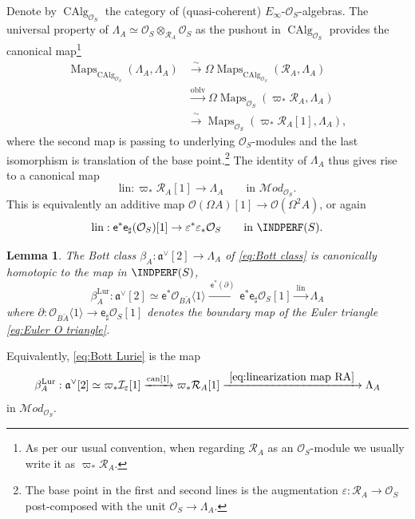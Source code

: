 \documentclass[12pt, oneside]{amsart}
\numberwithin{equation}{section}
\newtheorem{lemma}[subsubsection]{Lemma}
\theoremstyle{remark}
\theoremstyle{plain}
\newcommand{\MOD}{\mathcal{M}\textit{od}}
\DeclareMathOperator{\Map}{Maps}
\newcommand{\R}{\mathcal{R}}
\newcommand{\RA}{\R_A}
\newcommand{\frav}{\mathfrak{a}^\vee}
\newcommand{\lam}{\Lambda}
\newcommand{\OO}{\mathcal{O}}
\newcommand{\CAlg}{\operatorname{CAlg}}
\newcommand{\Thom}[1]{\langle #1 \rangle}
\newcommand{\eps}{\varepsilon}
\newcommand{\sfe}{\mathsf{e}}
\begin{document}
Denote by $\CAlg_{\OO_S}$ the category of (quasi-coherent) $E_\infty$-$\OO_S$-algebras.
The universal property of $\lam_A \simeq \OO_S \otimes_{\RA} \OO_S$ as the pushout in $\CAlg_{\OO_S}$ provides the canonical map\footnote{%
  As per our usual convention, when regarding $\RA$ as an $\OO_S$-module we usually write it as $\varpi_* \RA$.
}
\[\begin{aligned}
  \Map_{\CAlg_{\OO_S}}(\lam_A, \lam_A)
  &\xrightarrow{~\sim~} \Omega \Map_{\CAlg_{\OO_S}}(\RA, \lam_A)\\
  &\xrightarrow{\mathrm{oblv}} \Omega \Map_{\OO_S}(\varpi_* \RA, \lam_A)\\
  &\xrightarrow{~\sim~} \Map_{\OO_S}(\varpi_* \RA[1], \lam_A),
\end{aligned}\]
where the second map is passing to underlying $\OO_S$-modules and the last isomorphism is translation of the base point.\footnote{%
  The base point in the first and second lines is the augmentation $\eps : \RA \to \OO_S$ post-composed with the unit $\OO_S \to \lam_A$.
}
The identity of $\lam_A$ thus gives rise to a canonical map
\begin{equation}\label{eq:linearization map RA}
  \mathrm{lin} : \varpi_* \RA[1] \to \lam_A
  \qquad \text{in } \MOD_{\OO_S}.
\end{equation}
This is equivalently an additive map $\OO(\Omega A)[1] \to \OO(\Omega^2 A)$, or again
\begin{equation}\label{eq:linearization map}
  \mathrm{lin} : \sfe^* \sfe_\sharp (\OO_S)[1] \to \eps^*\eps_*\OO_S
  \qquad \text{in } \INDPERF(S).
\end{equation}

\begin{lemma}\label{lem:Bott vs Lurie}
  The Bott class $\beta_A : \frav[2] \to \lam_A$ of \eqref{eq:Bott class} is canonically homotopic to the map in $\INDPERF(S)$,
  \begin{equation}\label{eq:Bott Lurie}
    \beta_A^{\mathrm{Lur}} : \frav[2]
    \simeq \sfe^* \OO_{B\check{A}}\Thom{1}
    \xrightarrow{\ \sfe^*(\partial)\ } \sfe^* \sfe_\sharp \OO_{S} [1]
    \xrightarrow{\ \mathrm{lin}\ } \lam_A
  \end{equation}
   where $\partial : \OO_{B\check{A}}\Thom{1} \to \sfe_\sharp \OO_{S} [1]$ denotes the boundary map of the Euler triangle \eqref{eq:Euler O triangle}.
\end{lemma}

Equivalently, \eqref{eq:Bott Lurie} is the map
\begin{equation}\label{eq:Bott Lurie 2}
	\beta_A^{\mathrm{Lur}} : \frav[2] \simeq \varpi_* \mathcal{I}_\eps [1] \xrightarrow{\text{can}[1]} \varpi_* \RA [1] \xrightarrow{\ \eqref{eq:linearization map RA}\ } \lam_A
\end{equation}
in $\MOD_{\OO_S}$.
\end{document}
